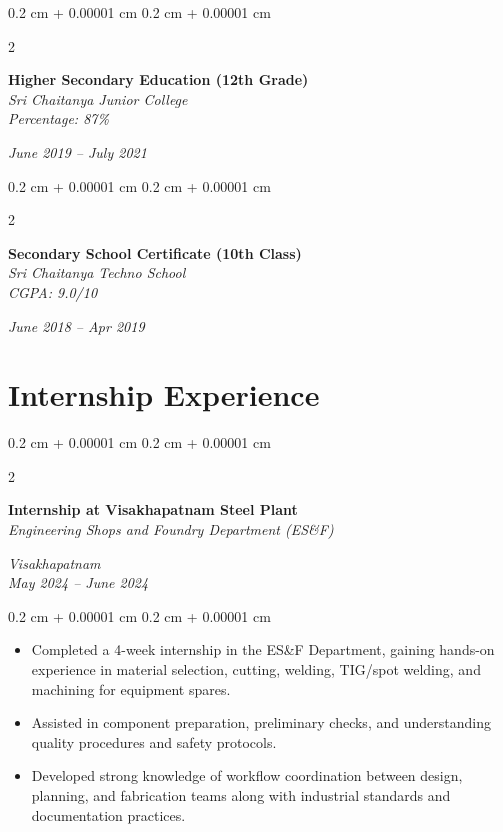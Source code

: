\documentclass[10pt, letterpaper]{article}
\newenvironment{highlights}{
    \begin{itemize}[
        topsep=0.10 cm,
        parsep=0.10 cm,
        partopsep=0pt,
        itemsep=0pt,
        leftmargin=0.4 cm + 10pt
    ]
}{
    \end{itemize}
} %
\newenvironment{onecolentry}{
    \begin{adjustwidth}{
        0.2 cm + 0.00001 cm
    }{
        0.2 cm + 0.00001 cm
    }
}{
    \end{adjustwidth}
} %
\newenvironment{twocolentry}[2][]{
    \onecolentry
    \def\secondColumn{#2}
    \setcolumnwidth{\fill, 4.5 cm}
    \begin{paracol}{2}
}{
    \switchcolumn \raggedleft \secondColumn
    \end{paracol}
    \endonecolentry
} %
\begin{document}
    \vspace{0.10 cm}
    \begin{twocolentry}{
        \textit{June 2019 – July 2021}
    }
        \textbf{Higher Secondary Education (12th Grade)} \\
        \textit{Sri Chaitanya Junior College} \\
        \textit{Percentage: 87\%}
    \end{twocolentry}

    \vspace{0.10 cm}
    \begin{twocolentry}{
        \textit{June 2018 – Apr 2019}
    }
        \textbf{Secondary School Certificate (10th Class)} \\
        \textit{Sri Chaitanya Techno School} \\
        \textit{CGPA: 9.0/10}
    \end{twocolentry}

    \section{Internship Experience}
    \begin{twocolentry}{
        \textit{Visakhapatnam} \\
        \textit{May 2024 – June 2024}
    }
        \textbf{Internship at Visakhapatnam Steel Plant} \\
        \textit{Engineering Shops and Foundry Department (ES\&F)}
    \end{twocolentry}
    \vspace{0.10 cm}
    \begin{onecolentry}
        \begin{highlights}
            \item Completed a 4-week internship in the ES\&F Department, gaining hands-on experience in material selection, cutting, welding, TIG/spot welding, and machining for equipment spares.
            \item Assisted in component preparation, preliminary checks, and understanding quality procedures and safety protocols.
            \item Developed strong knowledge of workflow coordination between design, planning, and fabrication teams along with industrial standards and documentation practices.
        \end{highlights}
    \end{onecolentry}
\end{document}
